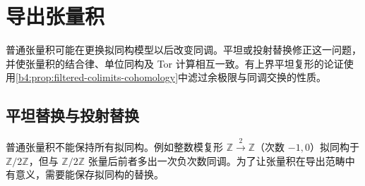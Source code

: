 
\section{导出张量积}
\label{b4:sec:1802}

普通张量积可能在更换拟同构模型以后改变同调。平坦或投射替换修正这一问题，并使张量积的结合律、单位同构及 Tor 计算相互一致。有上界平坦复形的论证使用\cref{b4:prop:filtered-colimits-cohomology}中滤过余极限与同调交换的性质。

%
%

\subsection{平坦替换与投射替换}
\label{b4:subsec:1802:01}

普通张量积不能保持所有拟同构。例如整数模复形 \(\mathbb Z\xrightarrow{2}\mathbb Z\)（次数 \(-1,0\)）拟同构于 \(\mathbb Z/2\mathbb Z\)，但与 \(\mathbb Z/2\mathbb Z\) 张量后前者多出一次负次数同调。为了让张量积在导出范畴中有意义，需要能保存拟同构的替换。

